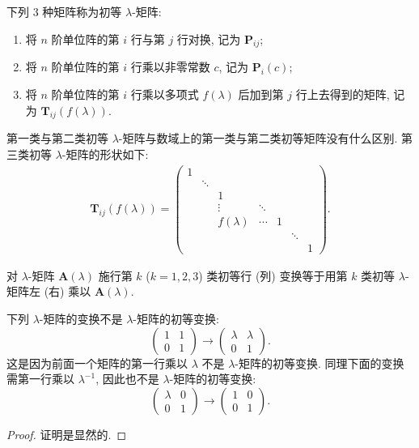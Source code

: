 \documentclass[../../main.tex]{subfiles}
\begin{document}
\begin{definition}[初等$\lambda$-矩阵]
下列 3 种矩阵称为初等 $\lambda$-矩阵:
\begin{enumerate}[(1)]
\item 将 $n$ 阶单位阵的第 $i$ 行与第 $j$ 行对换, 记为 $\boldsymbol{P}_{ij}$;

\item 将 $n$ 阶单位阵的第 $i$ 行乘以非零常数 $c$, 记为 $\boldsymbol{P}_{i}(c)$;

\item 将 $n$ 阶单位阵的第 $i$ 行乘以多项式 $f(\lambda)$ 后加到第 $j$ 行上去得到的矩阵, 记为 $\boldsymbol{T}_{ij}(f(\lambda))$.
\end{enumerate}
\end{definition}
\begin{remark}
第一类与第二类初等 $\lambda$-矩阵与数域上的第一类与第二类初等矩阵没有什么区别. 第三类初等 $\lambda$-矩阵的形状如下:
\begin{align*}
\boldsymbol{T}_{ij}(f(\lambda))=
\begin{pmatrix}
1 & & & & & \\
& \ddots & & & & \\
& & 1 & & & \\
& & \vdots & \ddots & & \\
& & f(\lambda) & \cdots & 1 & \\
& & & & & \ddots & \\
& & & & & & 1
\end{pmatrix}.
\end{align*} 
\end{remark}

\begin{theorem}
对 $\lambda$-矩阵 $\boldsymbol{A}(\lambda)$ 施行第 $k$ ($k = 1,2,3$) 类初等行 (列) 变换等于用第 $k$ 类初等 $\lambda$-矩阵左 (右) 乘以 $\boldsymbol{A}(\lambda)$. 
\end{theorem}
\begin{remark}
下列 $\lambda$-矩阵的变换不是 $\lambda$-矩阵的初等变换:
\[
\begin{pmatrix}
1 & 1 \\
0 & 1
\end{pmatrix}
\rightarrow
\begin{pmatrix}
\lambda & \lambda \\
0 & 1
\end{pmatrix}.
\]
这是因为前面一个矩阵的第一行乘以 $\lambda$ 不是 $\lambda$-矩阵的初等变换. 同理下面的变换需第一行乘以 $\lambda^{-1}$, 因此也不是 $\lambda$-矩阵的初等变换:
\[
\begin{pmatrix}
\lambda & 0 \\
0 & 1
\end{pmatrix}
\rightarrow
\begin{pmatrix}
1 & 0 \\
0 & 1
\end{pmatrix}.
\] 
\end{remark}
\begin{proof}
证明是显然的.

\end{proof}
\end{document}
